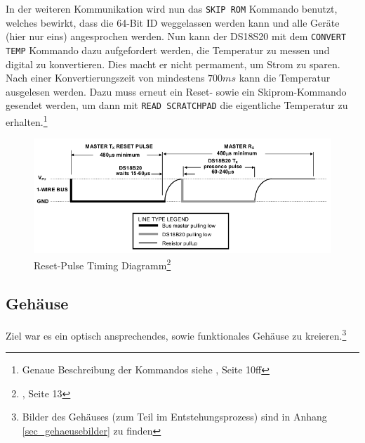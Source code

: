 In der weiteren Kommunikation wird nun das \texttt{SKIP ROM} Kommando benutzt, welches bewirkt, dass die 64-Bit ID weggelassen werden kann und alle Geräte (hier nur eins) angesprochen werden. Nun kann der DS18S20 mit dem \texttt{CONVERT TEMP} Kommando dazu aufgefordert werden, die Temperatur zu messen und digital zu konvertieren. Dies macht er nicht permament, um Strom zu sparen. Nach einer Konvertierungszeit von mindestens $700 ms$ kann die Temperatur ausgelesen werden. Dazu muss erneut ein Reset- sowie ein Skiprom-Kommando gesendet werden, um dann mit \texttt{READ SCRATCHPAD} die eigentliche Temperatur zu erhalten.\footnote{Genaue Beschreibung der Kommandos siehe \cite{ds18s20}, Seite 10ff}
%
\begin{figure}[htp]
\centering
\centerline{\includegraphics[width=\linewidth]{skizzen/temperatur_reset.png}}
\caption{Reset-Pulse Timing Diagramm\footnote{\cite{ds18s20}, Seite 13}}\label{fig_resettiming}
\end{figure}
%
\subsection{Gehäuse}
%
Ziel war es ein optisch ansprechendes, sowie funktionales Gehäuse zu kreieren.\footnote{Bilder des Gehäuses (zum Teil im Entstehungsprozess) sind in Anhang \ref{sec_gehaeusebilder} zu finden}

